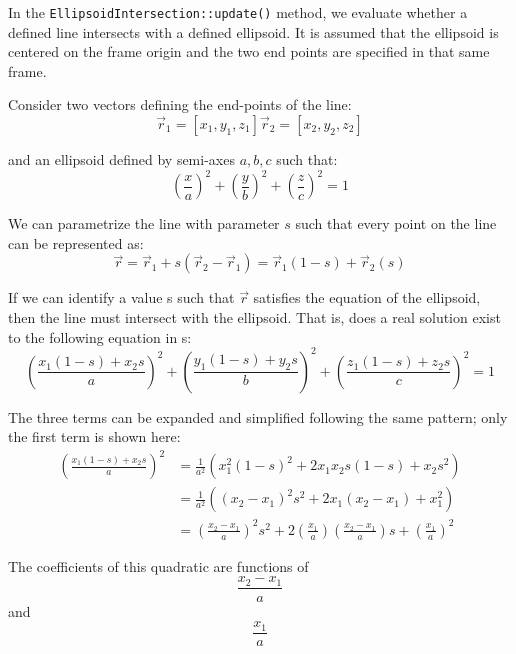 \documentclass[11pt,fleqn]{report}
\begin{document}
In the \texttt{EllipsoidIntersection::update()} method, we evaluate whether
a defined line intersects with a defined ellipsoid. It is assumed that the
ellipsoid is centered on the frame origin and the two end points are
specified in that same frame.

Consider two vectors defining the end-points of the line:
\begin{equation*}
\vec r_1 = [ x_1, y_1, z_1]
\vec r_2 = [ x_2, y_2, z_2]
\end{equation*}

and an ellipsoid defined by semi-axes ${a, b, c}$ such that:
\begin{equation*}
\left( \frac{x}{a} \right)^2 +
\left( \frac{y}{b} \right)^2 +
\left( \frac{z}{c} \right)^2= 1
\end{equation*}

We can parametrize the line with parameter $s$ such that every point on the
line can be represented as:
\begin{equation*}
\vec r = \vec r_1 + s( \vec r_2 - \vec r_1) = \vec r_1 (1-s) + \vec r_2 (s)
\end{equation*}

If we can identify a value s such that $\vec r$ satisfies the equation of
the ellipsoid, then the line must intersect with the ellipsoid. That is,
does a real solution exist to the following equation in s:
\begin{equation}\label{eqn:ellipsoid_intersect}
\left( \frac{x_1(1-s) + x_2 s}{a} \right)^2 +
\left( \frac{y_1(1-s) + y_2 s}{b} \right)^2 +
\left( \frac{z_1(1-s) + z_2 s}{c} \right)^2= 1
\end{equation}

The three terms can be expanded and simplified following the same pattern;
only the first term is shown here:
\begin{align*}
\left( \frac{x_1(1-s) + x_2 s}{a} \right)^2 & =
\frac{1}{a^2} \left( x_1^2(1-s)^2 + 2 x_1 x_2 s (1-s) + x_2 s^2 \right) \\
{} & = \frac{1}{a^2} \left( (x_2 - x_1)^2 s^2 + 2 x_1 (x_2 - x_1) + x_1^2 \right) \\
{} & = \left( \frac{x_2 - x_1}{a} \right)^2 s^2 +
 2 \left( \frac{x_1}{a} \right) \left( \frac{x_2 - x_1}{a} \right) s +
 \left( \frac{x_1}{a} \right)^2
\end{align*}

The coefficients of this quadratic are functions of
\begin{equation*}
\frac{x_2 - x_1}{a}
\end{equation*}
and
\begin{equation*}
\frac{x_1}{a}
\end{equation*}
\end{document}
